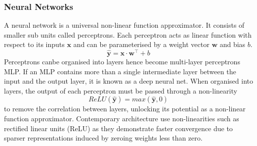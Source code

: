 \subsubsection{Neural Networks}
A neural network is a universal non-linear function approximator. It
consists of smaller sub units called perceptrons. Each perceptron acts as linear
function with respect to its inputs $\mathbf{x}$ and can be parameterised by a weight
vector $\mathbf{w}$ and bias $b$.
\begin{equation}
    \mathbf{\hat{y}} =\mathbf{x} \cdot \mathbf{w}^\top + b
\end{equation}
Perceptrons canbe organised into layers hence become multi-layer perceptrons MLP.
If an MLP contains more than a single intermediate layer between the input and the output
layer, it is known as a deep neural net. When organised into layers, the output
of each perceptron must be passed through a non-linearity \[ReLU(\mathbf{\hat{y}}) = max (\mathbf{\hat{y}},0)\] to remove the correlation between
layers, unlocking its potential as a non-linear function approximator.
Contemporary architecture use non-linearities such as rectified linear units (ReLU)
as they demonstrate faster convergence due to sparser representations induced by zeroing weights less than zero.
